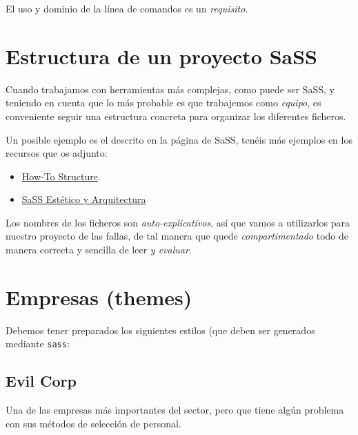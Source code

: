 \documentclass[a4paper,10pt]{article}
\begin{document}
El uso y dominio de la línea de comandos es un \textit{requisito}.

\section{Estructura de un proyecto SaSS}

Cuando trabajamos con herramientas más complejas, como puede ser SaSS, y teniendo en cuenta que lo más probable es que trabajemos como \textit{equipo}, es conveniente seguir una estructura concreta para organizar los diferentes ficheros.

Un posible ejemplo es el descrito en la página de SaSS, tenéis más ejemplos en los recursos que os adjunto:

\begin{itemize}
  \item \href{http://thesassway.com/beginner/how-to-structure-a-sass-project}{How-To Structure}.
  \item \href{https://scotch.io/tutorials/aesthetic-sass-1-architecture-and-style-organization}{SaSS Estético y Arquitectura}
\end{itemize}

Los nombres de los ficheros son \textit{auto-explicativos}, así que vamos a utilizarlos para nuestro proyecto de las fallas, de tal manera que quede \textit{compartimentado} todo de manera correcta y sencilla de leer \textit{y evaluar}.

\section{Empresas (themes)}

Debemos tener preparados los siguientes estilos (que deben ser generados mediante \texttt{sass}:

\subsection{ Evil Corp }

Una de las empresas más importantes del sector, pero que tiene algún problema con sus métodos de selección de personal.
\end{document}
